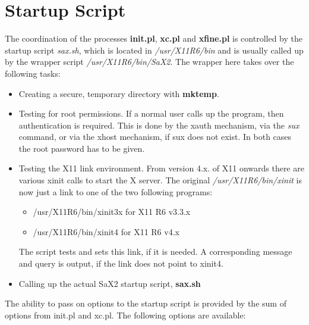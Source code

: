 \section{Startup Script}
\label{sec:sta}
The coordination of the processes \textbf{init.pl}, \textbf{xc.pl}
and \textbf{xfine.pl} is controlled by the startup script \textit{sax.sh}, 
which is located in \textit{/usr/X11R6/bin} and is usually called up by the 
wrapper script \textit{/usr/X11R6/bin/SaX2}. The wrapper here takes over the
following tasks:
\begin{itemize}
\item Creating a secure, temporary directory with \textbf{mktemp}. 
\item Testing for root permissions. If a normal user calls up the program,
  then authentication is required. This is done by the xauth mechanism, via
  the  \textit{sux} command, or via the xhost mechanism, if sux does not
  exist. In both cases the root password has to be given.  
\item Testing the X11 link environment. From version 4.x. of X11 onwards
  there are various xinit calls to start the X server. The original
  \textit{/usr/X11R6/bin/xinit} is now just a link to one of the two following
  programs:
      \begin{itemize}
      \item /usr/X11R6/bin/xinit3x for X11 R6 v3.3.x
      \item /usr/X11R6/bin/xinit4  for X11 R6 v4.x
      \end{itemize} 
      The script tests and sets this link, if it is needed. A corresponding
      message and query is output, if the link does not point to xinit4. 
\item Calling up the actual SaX2 startup script, \textbf{sax.sh}
\end{itemize}
The ability to pass on options to the startup script is provided by the sum of
options from init.pl and xc.pl.
The following options are available:
